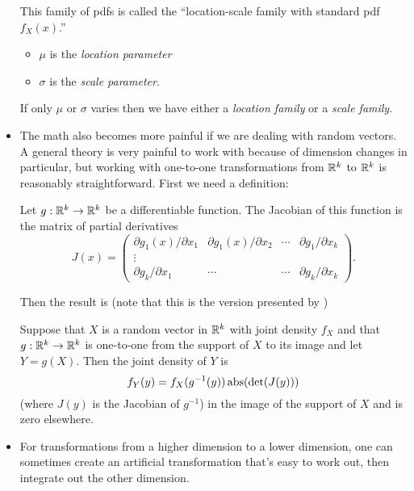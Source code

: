\begin{itemize}[leftmargin=0pt]
  This family of pdfs is called the ``location-scale family with
  standard pdf $f_X(x)$.''
  \begin{itemize}
  \item $\mu$ is the \emph{location parameter}
  \item $\sigma$ is the \emph{scale parameter}.
  \end{itemize}
  If only $\mu$ or $\sigma$ varies then we have either a \emph{location
  family} or a \emph{scale family}.

\item The math also becomes more painful if we are dealing with random
  vectors.  A general theory is very painful to work with because of
  dimension changes in particular, but working with one-to-one
  transformations from $\mathbb{R}^k$ to $\mathbb{R}^k$ is reasonably straightforward.
  First we need a definition:
  
  \begin{defn}
    Let $g: \mathbb{R}^k \to \mathbb{R}^k$ be a differentiable function.  The Jacobian
    of this function is the matrix of partial derivatives
    \begin{equation*}
      J(x) =
      \begin{pmatrix} \partial g_1(x)/\partial x_1 & \partial g_1(x)/\partial x_2 & \cdots & \partial g_1/\partial x_k \\
      \vdots \\
      \partial g_k/\partial x_1 & \cdots & \cdots & \partial g_k/\partial x_k
      \end{pmatrix}.
    \end{equation*}
  \end{defn}
      
  Then the result is (note that this is the version presented by
  \citealp[B.7.7]{Gre12})
  \begin{thm}
    Suppose that $X$ is a random vector in $\mathbb{R}^k$ with joint density
    $f_X$ and that $g: \mathbb{R}^k \to \mathbb{R}^k$ is one-to-one from the support of
    $X$ to its image and let $Y = g(X)$.  Then the joint density of $Y$ is
    \begin{equation}
      f_Y(y) = f_X(g^{-1}(y)) \operatorname{abs}(\det( J(y) ))
    \end{equation}
    (where $J(y)$ is the Jacobian of $g^{-1}$) in the image of the support
    of $X$ and is zero elsewhere.
  \end{thm}

\item For transformations from a higher dimension to a lower
  dimension, one can sometimes create an artificial transformation
  that's easy to work out, then integrate out the other dimension.

\end{itemize}

